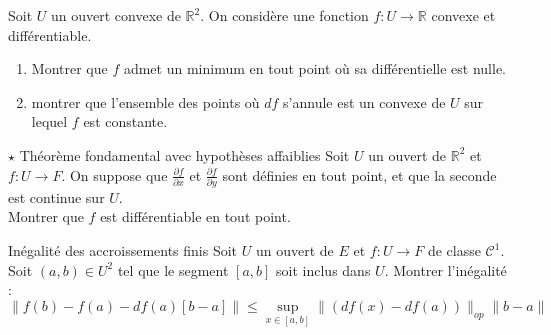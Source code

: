 \documentclass[french,a4paper]{article}
\newcommand{\R}{\mathbb{R}}
\theoremstyle{plain}
\theoremstyle{definition}
\theoremstyle{remark}
\begin{document}
\begin{ex}[Moulin.CD.14]{}
	Soit $U$ un ouvert convexe de $\R^2$. On considère une fonction $f:U\to\R$ convexe et différentiable.
	\begin{enumerate}
		\item Montrer que $f$ admet un minimum en tout point où sa différentielle est nulle.
		\item montrer que l'ensemble des points où $df$ s'annule est un convexe de $U$ sur lequel $f$ est constante.
	\end{enumerate}
\end{ex}

\begin{ex}[Moulin.CD.15]{$\star$ Théorème fondamental avec hypothèses affaiblies}
	Soit $U$ un ouvert de $\R^2$ et $f:U\to F$. On suppose que $\displaystyle\frac{\partial f}{\partial x}$ et $\displaystyle\frac{\partial f}{\partial y}$ sont définies en tout point, et que la seconde est continue sur $U$. \\ Montrer que $f$ est différentiable en tout point.
\end{ex}

\begin{ex}[Moulin.CD.16]{Inégalité des accroissements finis}
	Soit $U$ un ouvert de $E$ et $f:U\to F$ de classe $\mathcal{C}^1$. Soit $(a,b)\in U^2$ tel que le segment $[a,b]$ soit inclus dans $U$. Montrer l'inégalité : $$\lVert f(b)-f(a)-df(a)[b-a]\rVert\leqslant\underset{x\in[a,b]}{\sup}\lVert(df(x)-df(a))\rVert_{op}\lVert b-a\rVert$$
\end{ex}
\end{document}
